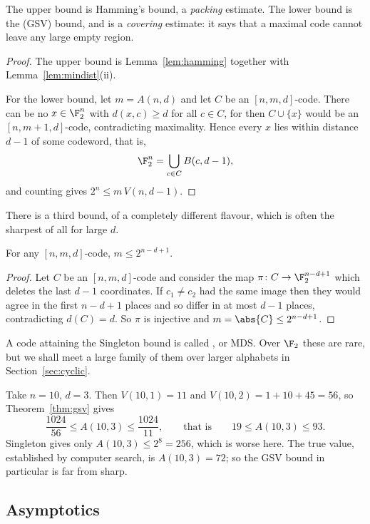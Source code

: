 The upper bound is Hamming's bound, a \emph{packing} estimate. The lower bound is the  (GSV) bound, and is a \emph{covering} estimate: it says that a maximal code cannot leave any large empty region.

\begin{proof}
	The upper bound is Lemma~\ref{lem:hamming} together with Lemma~\ref{lem:mindist}(ii).

	For the lower bound, let $m = A(n,d)$ and let $C$ be an $[n,m,d]$-code. There can be no $x \in \F_2^n$ with $d(x,c) \ge d$ for all $c \in C$, for then $C \cup \{x\}$ would be an $[n,m+1,d]$-code, contradicting maximality. Hence every $x$ lies within distance $d-1$ of some codeword, that is,
	$$\F_2^n = \bigcup_{c \in C} B(c,d-1),$$
	and counting gives $2^n \le m\,V(n,d-1)$.
\end{proof}

There is a third bound, of a completely different flavour, which is often the sharpest of all for large $d$.

\begin{theorem}\label{thm:singleton}
	For any $[n,m,d]$-code, $m \le 2^{n-d+1}$.
\end{theorem}

\begin{proof}
	Let $C$ be an $[n,m,d]$-code and consider the map $\pi \colon C \to \F_2^{n-d+1}$ which deletes the last $d-1$ coordinates. If $c_1 \ne c_2$ had the same image then they would agree in the first $n-d+1$ places and so differ in at most $d-1$ places, contradicting $d(C) = d$. So $\pi$ is injective and $m = \abs{C} \le 2^{n-d+1}$.
\end{proof}

A code attaining the Singleton bound is called , or MDS. Over $\F_2$ these are rare, but we shall meet a large family of them over larger alphabets in Section~\ref{sec:cyclic}.

\begin{example}
	Take $n = 10$, $d = 3$. Then $V(10,1) = 11$ and $V(10,2) = 1 + 10 + 45 = 56$, so Theorem~\ref{thm:gsv} gives
	$$\frac{1024}{56} \le A(10,3) \le \frac{1024}{11}, \qquad \text{that is} \qquad 19 \le A(10,3) \le 93.$$
	Singleton gives only $A(10,3) \le 2^8 = 256$, which is worse here. The true value, established by computer search, is $A(10,3) = 72$; so the GSV bound in particular is far from sharp.
\end{example}

\subsection{Asymptotics}

